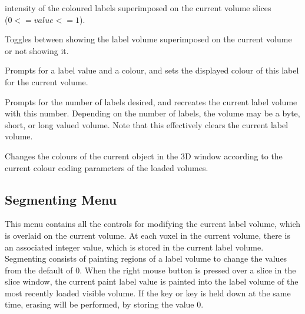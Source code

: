 \begin{description}
                      intensity of the coloured labels superimposed on the 
                      current volume slices \\
                      ($0 <= value <= 1$).
\item[\menutwo{Colour Coding}{Show Labels}]  Toggles between showing
                      the label volume superimposed on the current
                      volume or not showing it.
\item[\menutwo{Colour Coding}{Set Paint Lbl Colr}]  Prompts for a
                      label value and a colour, and sets the displayed
                      colour of this label for the current volume.
\item[\menutwo{Colour Coding}{Num Labels}]  Prompts for the number
                      of labels desired, and recreates the current label volume
                      with this number.  Depending on the number of labels,
                      the volume may be a byte, short, or long valued volume.
                      Note that this effectively clears the current
                      label volume.
\item[\menutwo{Colour Coding}{Colour Code Object}]  Changes the
     colours of the current object in the 3D window according to the current
     colour coding parameters of the loaded volumes.
\end{description}

\subsection{Segmenting Menu}

This menu contains all the controls for modifying the current label volume,
which is overlaid on the current volume.  At each voxel in the current
volume, there is an associated integer value, which is
stored in the current label volume.  Segmenting consists of painting regions
of a label volume to change the values from the default of 0.
When the right mouse button is pressed over a slice in the slice
window, the current paint label value is painted into the label volume of the
most recently loaded visible volume.  If the  key or
 key is held down
at the same time, erasing will be performed, by storing the value 0.

